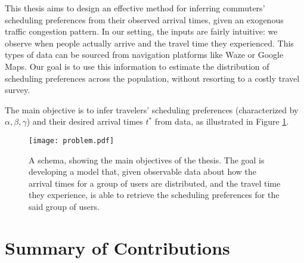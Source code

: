 This thesis aims to design an effective method for inferring commuters' scheduling preferences from their observed arrival times, given an exogenous traffic congestion pattern. In our setting, the inputs are fairly intuitive: we observe when people actually arrive and the travel time they experienced. This types of data can be sourced from navigation platforms like Waze or Google Maps. Our goal is to use this information to estimate the distribution of scheduling preferences across the population, without resorting to a costly travel survey. 


The main objective is to infer travelers' scheduling preferences (characterized by $\alpha, \beta, \gamma$) and their desired arrival times $t^*$ from data, as illustrated in Figure \ref{fig:zhenyu_arrow}. 


\begin{figure}
    \centering
    \texttt{[image: problem.pdf]}
    \caption{A schema, showing the main objectives of the thesis.
      The goal is developing a model that, given observable data about how the arrival times for a group of users are distributed,
      and the travel time they experience,
    is able to retrieve the scheduling preferences for the said group of users.}
 \label{fig:zhenyu_arrow}
\end{figure}


\section{Summary of Contributions} 






